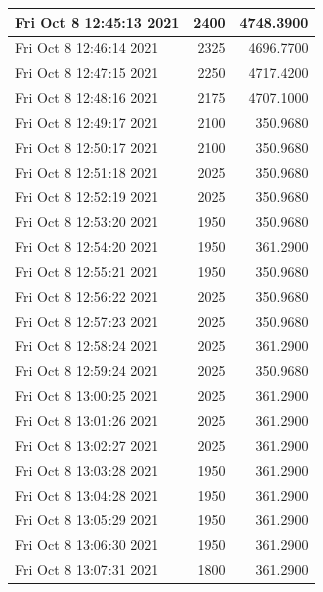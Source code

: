 \begin{longtable}{|l|r|r|}
Fri Oct  8 12:45:13 2021 &               2400 &       4748.3900 \\ \hline
Fri Oct  8 12:46:14 2021 &               2325 &       4696.7700 \\ \hline
Fri Oct  8 12:47:15 2021 &               2250 &       4717.4200 \\ \hline
Fri Oct  8 12:48:16 2021 &               2175 &       4707.1000 \\ \hline
Fri Oct  8 12:49:17 2021 &               2100 &        350.9680 \\ \hline
Fri Oct  8 12:50:17 2021 &               2100 &        350.9680 \\ \hline
Fri Oct  8 12:51:18 2021 &               2025 &        350.9680 \\ \hline
Fri Oct  8 12:52:19 2021 &               2025 &        350.9680 \\ \hline
Fri Oct  8 12:53:20 2021 &               1950 &        350.9680 \\ \hline
Fri Oct  8 12:54:20 2021 &               1950 &        361.2900 \\ \hline
Fri Oct  8 12:55:21 2021 &               1950 &        350.9680 \\ \hline
Fri Oct  8 12:56:22 2021 &               2025 &        350.9680 \\ \hline
Fri Oct  8 12:57:23 2021 &               2025 &        350.9680 \\ \hline
Fri Oct  8 12:58:24 2021 &               2025 &        361.2900 \\ \hline
Fri Oct  8 12:59:24 2021 &               2025 &        350.9680 \\ \hline
Fri Oct  8 13:00:25 2021 &               2025 &        361.2900 \\ \hline
Fri Oct  8 13:01:26 2021 &               2025 &        361.2900 \\ \hline
Fri Oct  8 13:02:27 2021 &               2025 &        361.2900 \\ \hline
Fri Oct  8 13:03:28 2021 &               1950 &        361.2900 \\ \hline
Fri Oct  8 13:04:28 2021 &               1950 &        361.2900 \\ \hline
Fri Oct  8 13:05:29 2021 &               1950 &        361.2900 \\ \hline
Fri Oct  8 13:06:30 2021 &               1950 &        361.2900 \\ \hline
Fri Oct  8 13:07:31 2021 &               1800 &        361.2900 \\ \hline

\end{longtable}
